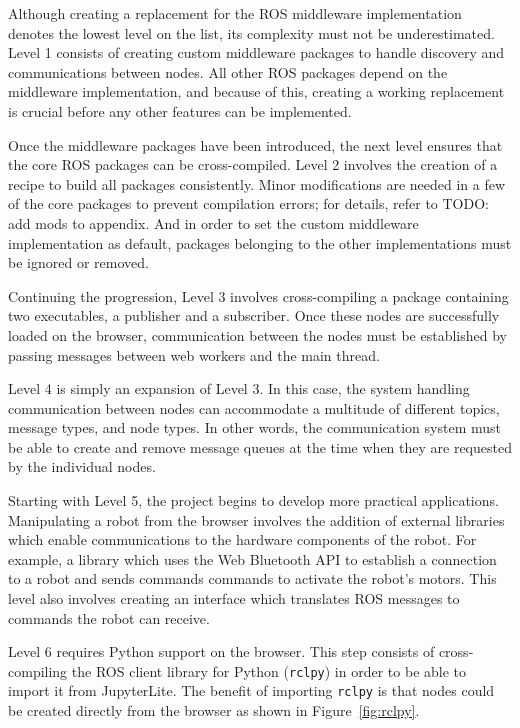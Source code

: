         Although creating a replacement for the \ac{ROS} middleware implementation denotes the lowest level on the list, its complexity must not be underestimated. Level 1 consists of creating custom middleware packages to handle discovery and communications between nodes. All other \ac{ROS} packages depend on the middleware implementation, and because of this, creating a working replacement is crucial before any other features can be implemented.

        Once the middleware packages have been introduced, the next level ensures that the core \ac{ROS} packages can be cross-compiled. Level 2 involves the creation of a recipe to build all packages consistently. Minor modifications are needed in a few of the core packages to prevent compilation errors; for details, refer to TODO: add mods to appendix. And in order to set the custom middleware implementation as default, packages belonging to the other implementations must be ignored or removed. 

        Continuing the progression, Level 3 involves cross-compiling a package containing two executables, a publisher and a subscriber. Once these nodes are successfully loaded on the browser, communication between the nodes must be established by passing messages between web workers and the main thread.

        Level 4 is simply an expansion of Level 3. In this case, the system handling communication between nodes can accommodate a multitude of different topics, message types, and node types. In other words, the communication system must be able to create and remove message queues at the time when they are requested by the individual nodes.

        Starting with Level 5, the project begins to develop more practical applications. Manipulating a robot from the browser involves the addition of external libraries which enable communications to the hardware components of the robot. For example, a library which uses the Web Bluetooth \ac{API} to establish a connection to a robot and sends commands commands to activate the robot's motors. This level also involves creating an interface which translates \ac{ROS} messages to commands the robot can receive.

        Level 6 requires Python support on the browser. This step consists of cross-compiling the \ac{ROS} client library for Python (\texttt{rclpy}) in order to be able to import it from JupyterLite. The benefit of importing \texttt{rclpy} is that nodes could be created directly from the browser as shown in Figure~\ref{fig:rclpy}. 

